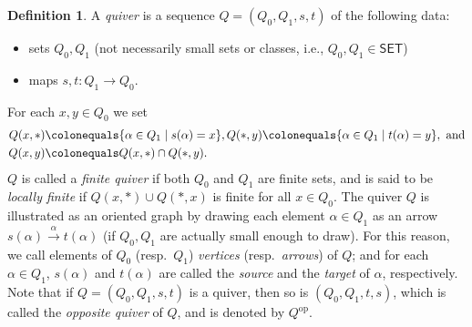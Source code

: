 \documentclass{surv-l}
\numberwithin{equation}{chapter}
\numberwithin{figure}{chapter}
\theoremstyle{plain}
\theoremstyle{definition}
\newtheorem{dfn}[thm]{Definition}
\theoremstyle{remark}
\begin{document}
\begin{dfn}
A \emph{quiver} is a sequence $Q = (Q_0, Q_1, s, t)$ of the following data:
\begin{itemize}
\item
sets $Q_0, Q_1$ (not necessarily small sets or classes, i.e., $Q_0, Q_1 \in \mathsf{SET}$)
\item
maps $s, t \colon Q_1 \to Q_0$.
\end{itemize}
For each $x, y \in Q_0$ we set
\[
\begin{aligned}
Q(x,*)&\colonequals  \{\alpha \in Q_1 \mid s(\alpha) = x\}, Q(*, y)\colonequals  \{\alpha \in Q_1 \mid t(\alpha) = y\}, \text{ and}\\
Q(x,y)&\colonequals  Q(x,*) \cap Q(*, y).
\end{aligned}
\]
$Q$ is called a \emph{finite quiver} if both $Q_0$ and $Q_1$ are finite sets,
and is said to be \emph{locally finite} if $Q(x,*) \cup Q(*, x)$ is finite for all
$x\in Q_0$.
The quiver $Q$ is illustrated as an oriented graph by drawing each element
$\alpha \in Q_1$ as an arrow $s(\alpha) \xrightarrow{\alpha} t(\alpha)$
(if $Q_0, Q_1$ are actually small enough to draw).
For this reason, we call elements of
$Q_0$ (resp.\ $Q_1$) \emph{vertices} (resp.\ \emph{arrows}) of $Q$; and
for each $\alpha \in Q_1$, $s(\alpha)$ and $t(\alpha)$ are called the \emph{source} and
the \emph{target} of $\alpha$, respectively.
Note that if $Q = (Q_0, Q_1, s, t)$ is a quiver, then so is
$(Q_0, Q_1, t, s)$, which is called the \emph{opposite quiver} of $Q$,
and is denoted by $Q^{\mathrm{op}}$.
\end{dfn}
\end{document}
